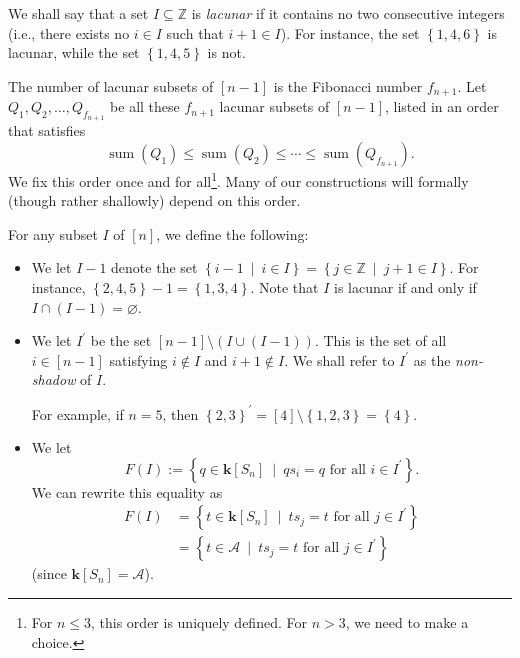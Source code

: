 \documentclass[numbers=enddot,12pt,final,onecolumn,notitlepage]{scrartcl}%
\theoremstyle{definition}
\begin{document}
We shall say that a set $I\subseteq\mathbb{Z}$ is \emph{lacunar} if it
contains no two consecutive integers (i.e., there exists no $i\in I$ such that
$i+1\in I$). For instance, the set $\left\{  1,4,6\right\}  $ is lacunar,
while the set $\left\{  1,4,5\right\}  $ is not.

The number of lacunar subsets of $\left[  n-1\right]  $ is the Fibonacci
number $f_{n+1}$. Let $Q_{1},Q_{2},\ldots,Q_{f_{n+1}}$ be all these $f_{n+1}$
lacunar subsets of $\left[  n-1\right]  $, listed in an order that satisfies%
\begin{equation}
\operatorname*{sum}\left(  Q_{1}\right)  \leq\operatorname*{sum}\left(
Q_{2}\right)  \leq\cdots\leq\operatorname*{sum}\left(  Q_{f_{n+1}}\right)  .
\label{pf.thm.t-simultri.sum-order}%
\end{equation}
We fix this order once and for all\footnote{For $n\leq3$, this order is
uniquely defined. For $n>3$, we need to make a choice.}. Many of our
constructions will formally (though rather shallowly) depend on this order.

For any subset $I$ of $\left[  n\right]  $, we define the following:

\begin{itemize}
\item We let $I-1$ denote the set $\left\{  i-1\ \mid\ i\in I\right\}
=\left\{  j\in\mathbb{Z}\ \mid\ j+1\in I\right\}  $. For instance, $\left\{
2,4,5\right\}  -1=\left\{  1,3,4\right\}  $. Note that $I$ is lacunar if and
only if $I\cap\left(  I-1\right)  =\varnothing$.

\item We let $I^{\prime}$ be the set $\left[  n-1\right]  \setminus\left(
I\cup\left(  I-1\right)  \right)  $. This is the set of all $i\in\left[
n-1\right]  $ satisfying $i\notin I$ and $i+1\notin I$. We shall refer to
$I^{\prime}$ as the \emph{non-shadow} of $I$.

For example, if $n=5$, then $\left\{  2,3\right\}  ^{\prime}=\left[  4\right]
\setminus\left\{  1,2,3\right\}  =\left\{  4\right\}  $.

\item We let
\[
F\left(  I\right)  :=\left\{  q\in\mathbf{k}\left[  S_{n}\right]
\ \mid\ qs_{i}=q\text{ for all }i\in I^{\prime}\right\}  .
\]
We can rewrite this equality as%
\begin{align}
F\left(  I\right)   &  =\left\{  t\in\mathbf{k}\left[  S_{n}\right]
\ \mid\ ts_{j}=t\text{ for all }j\in I^{\prime}\right\} \nonumber\\
&  =\left\{  t\in\mathcal{A}\ \mid\ ts_{j}=t\text{ for all }j\in I^{\prime
}\right\}  \label{eq.FI=.2}%
\end{align}
(since $\mathbf{k}\left[  S_{n}\right]  =\mathcal{A}$).
\end{itemize}
\end{document}
